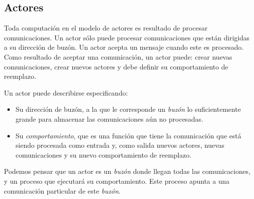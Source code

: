 \subsection{Actores}

Toda computación en el modelo de actores es resultado de procesar comunicaciones. Un actor sólo puede procesar comunicaciones que están dirigidas a su dirección de buzón. Un actor acepta un mensaje cuando este es procesado.  Como resultado de aceptar una comunicación, un actor puede: crear nuevas comunicaciones, crear nuevos actores y debe definir su comportamiento de reemplazo.


Un actor puede describirse especificando:

\begin{itemize}
 \item Su dirección de buzón, a la que le corresponde un \textit{buzón} lo suficientemente grande para almacenar las comunicaciones aún no procesadas.
 \item Su \textit{comportamiento}, que es una función que tiene la comunicación que está siendo procesada como entrada y, como salida nuevos actores, nuevas comunicaciones y su nuevo comportamiento de reemplazo.
\end{itemize}

Podemos pensar que un actor es un \textit{buzón} donde llegan todas las comunicaciones, y un proceso que ejecutará su comportamiento. Este proceso apunta a una comunicación particular de este \textit{buzón}. 

% 
% 
% 
% 
% 
% 
% 
% 


